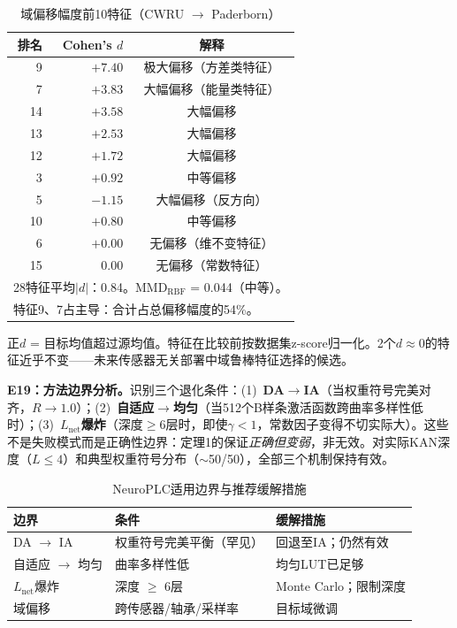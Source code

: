 \documentclass[journal,onecolumn]{IEEEtran}
\theoremstyle{definition}
\theoremstyle{plain}
\theoremstyle{remark}
\begin{document}
\begin{table}[!t]
\centering
\caption{域偏移幅度前10特征（CWRU $\to$ Paderborn）}
\label{tab:paderborn_cohens_d}
\footnotesize
\begin{tabular}{@{}rrc@{}}
\toprule
\textbf{排名} & \textbf{Cohen's $d$} & \textbf{解释} \\
\midrule
 9 & $+7.40$ & 极大偏移（方差类特征） \\
 7 & $+3.83$ & 大幅偏移（能量类特征） \\
14 & $+3.58$ & 大幅偏移 \\
13 & $+2.53$ & 大幅偏移 \\
12 & $+1.72$ & 大幅偏移 \\
 3 & $+0.92$ & 中等偏移 \\
 5 & $-1.15$ & 大幅偏移（反方向） \\
10 & $+0.80$ & 中等偏移 \\
 6 & $+0.00$ & 无偏移（维不变特征） \\
15 & $ 0.00$ & 无偏移（常数特征） \\
\midrule
\multicolumn{3}{l}{28特征平均$|d|$：0.84。MMD$_{\text{RBF}}$ = 0.044（中等）。} \\
\multicolumn{3}{l}{特征9、7占主导：合计占总偏移幅度的54\%。} \\
\bottomrule
\end{tabular}
\vspace{2pt}
{\scriptsize 正$d$ = 目标均值超过源均值。特征在比较前按数据集z-score归一化。2个$d \approx 0$的特征近乎不变——未来传感器无关部署中域鲁棒特征选择的候选。}
\end{table}

\noindent\textbf{E19：方法边界分析。}识别三个退化条件：(1)~\textbf{DA$\to$IA}（当权重符号完美对齐，$R \to 1.0$）；(2)~\textbf{自适应$\to$均匀}（当512个B样条激活函数跨曲率多样性低时）；(3)~\textbf{$L_{\text{net}}$爆炸}（深度$\geq$6层时，即使$\gamma < 1$，常数因子变得不切实际大）。这些不是失败模式而是正确性边界：定理1的保证\textit{正确但变弱}，非无效。对实际KAN深度（$L \leq 4$）和典型权重符号分布（$\sim$50/50），全部三个机制保持有效。

\begin{table}[!t]
\centering
\caption{NeuroPLC适用边界与推荐缓解措施}
\label{tab:boundaries}
\footnotesize
\begin{tabular}{@{}p{1.9cm}p{2.9cm}p{2.9cm}@{}}
\toprule
\textbf{边界} & \textbf{条件} & \textbf{缓解措施} \\
\midrule
DA $\rightarrow$ IA & 权重符号完美平衡（罕见） & 回退至IA；仍然有效 \\
\addlinespace
自适应 $\rightarrow$ 均匀 & 曲率多样性低 & 均匀LUT已足够 \\
\addlinespace
$L_{\text{net}}$爆炸 & 深度 $\geq$ 6层 & Monte Carlo；限制深度 \\
\addlinespace
域偏移 & 跨传感器/轴承/采样率 & 目标域微调 \\
\bottomrule
\end{tabular}
\end{table}
\end{document}
